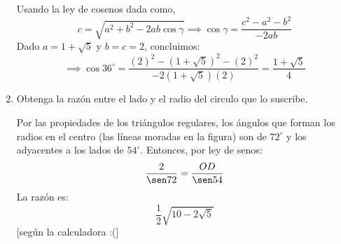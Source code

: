 \begin{problema}
\begin{enumerate}
	   	\begin{dem}
	   Usando la ley de cosenos dada como, 
	   $$c=\sqrt{a^2+b^2-2ab\cos\gamma}\implies \cos\gamma =\frac{c^2-a^2-b^2}{-2ab}$$
	   Dado $a=1+\sqrt{5}$ y $b=c= 2$, concluimos:
	   $$\implies \cos36^\circ = \frac{(2)^2-(1+\sqrt{5})^2-(2)^2}{-2(1+\sqrt{5})(2)}= \frac{1+\sqrt{5}}{4}$$ 
	   \end{dem}
	   \item Obtenga la razón entre el lado y el radio del circulo que lo suscribe.
	   	\begin{dem}
	   		Por las propiedades de los triángulos regulares, los ángulos que forman los radios en el centro (las líneas moradas en la figura) son de $72^\circ$ y los adyacentes a los lados de $54^\circ$. 
	   		Entonces, por ley de senos: 
	   		$$\frac{2}{\sen72}=\frac{OD}{\sen 54}$$
	   	La razón es: 
	   	$$\frac{1}{2}\sqrt{10-2\sqrt{5}}$$
	   	[según la calculadora :(]
	   \end{dem}
	\end{enumerate}
\end{problema}








